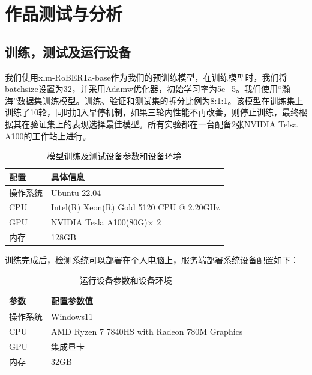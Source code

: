 \documentclass[a4paper]{report}
\begin{document}
\chapter{作品测试与分析}
\section{训练，测试及运行设备}
我们使用xlm-RoBERTa-base作为我们的预训练模型，在训练模型时，我们将batchsize设置为32，并采用Adamw优化器，初始学习率为5e−5。我们使用“瀚海”数据集训练模型。训练、验证和测试集的拆分比例为8:1:1。该模型在训练集上训练了10轮，同时加入早停机制，如果三轮内性能不再改善，则停止训练，最终根据其在验证集上的表现选择最佳模型。所有实验都在一台配备2张NVIDIA Telsa A100的工作站上进行。
\begin{table}[H]
	\centering
	\begin{tabular}{>{\centering\arraybackslash}p{5cm} >{\centering\arraybackslash}p{8cm}}
		\toprule
		配置   & 具体信息                                     \\
		\midrule
		操作系统 & Ubuntu 22.04                             \\
		\midrule
		CPU  & Intel(R) Xeon(R) Gold 5120 CPU @ 2.20GHz \\
		\midrule
		GPU  & NVIDIA Tesla A100(80G)$\times$ 2         \\
		\midrule
		内存   & 128GB                                    \\
		\bottomrule
	\end{tabular}
	\caption{模型训练及测试设备参数和设备环境}
\end{table}
训练完成后，检测系统可以部署在个人电脑上，服务端部署系统设备配置如下：
\begin{table}[H]
	\centering
	\begin{tabular}{>{\centering\arraybackslash}p{5cm} >{\centering\arraybackslash}p{8cm}}
		\toprule
		参数   & 配置参数值                                        \\
		\midrule
		操作系统 & Windows11                                    \\
		\midrule
		CPU  & AMD Ryzen 7 7840HS with Radeon 780M Graphics \\
		\midrule
		GPU  & 集成显卡                                         \\
		\midrule
		内存   & 32GB                                         \\
		\bottomrule
	\end{tabular}
	\caption{运行设备参数和设备环境}
\end{table}
\end{document}
